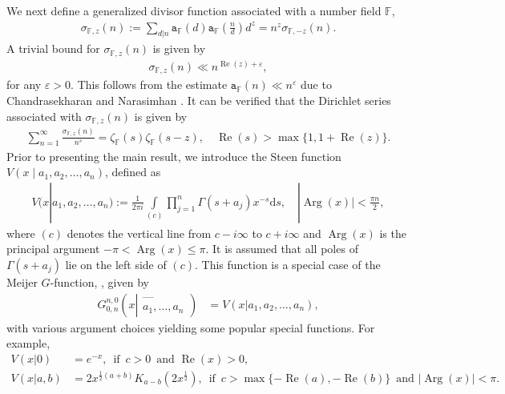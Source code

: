 \documentclass[12pt,reqno]{amsart}
\newcommand{\Arg}{\operatorname{Arg}}
\renewcommand{\Re}{\operatorname{Re}}
\renewcommand{\(}{\left\(}
\renewcommand{\)}{\right\)}
\renewcommand{\[}{\left\[}
\renewcommand{\]}{\right\]}
\numberwithin{equation}{section}
\theoremstyle{plain}
\begin{document}
We next define a generalized divisor function associated with a number field $\mathbb{F}$, 
\begin{align}\label{Gen sigma fn}
\sigma_{\mathbb{F}, z}(n) := \sum_{d|n}\mathtt{a}_{\mathbb{F}}(d)\mathtt{a}_{\mathbb{F}}\left(\frac{n}{d}\right)d^z = n^{z}\sigma_{\mathbb{F}, -z}(n).
\end{align}
A trivial bound for $\sigma_{\mathbb{F},z}(n)$ is given by
\begin{align}\label{sigma bound}
\sigma_{\mathbb{F},z}(n) \ll n^{\Re(z)+\varepsilon},
\end{align}
for any $\varepsilon>0$. This follows from the estimate
$\mathtt{a}_{\mathbb{F}}(n) \ll n^{\varepsilon}$ due to
Chandrasekharan and Narasimhan \cite[Lemma~9]{CN1963}.
It can be verified that the Dirichlet series associated with $\sigma_{\mathbb{F},z}(n)$ is given by
\begin{align}\label{Dirichlet series for generalized divisor function}
\sum_{n=1}^{\infty}\frac{\sigma_{\mathbb{F}, z}(n)}{n^s} = \zeta_{\mathbb{F}}(s)\zeta_{\mathbb{F}}(s-z), \quad \Re(s) > \max\{1, 1+\Re(z)\}.
\end{align}
Prior to presenting the main result, we introduce the Steen function $V(x\mid a_1,a_2,\dots,a_n)$, defined as
\begin{align}\label{Steen fn}
V(x| a_1, a_2, \ldots, a_n) := \frac{1}{2\pi i}\int\limits_{(c)}\prod_{j=1}^{n}\Gamma(s + a_j)x^{-s}\text{d}s, \quad |\Arg(x)| < \frac{\pi n}{2}, 
\end{align}
where $(c)$ denotes the vertical line from $c - i\infty$ to $c + i\infty$ and $\Arg(x)$ is the principal argument $-\pi < \Arg(x) \leq \pi$. It is assumed that all poles of $\Gamma(s+a_j)$ lie on the left side of $(c)$.
This function is a special case of the Meijer $G$-function, \cite[p.~415, Def.~16.17]{OLBC2010}, given by
\begin{align*}
G^{n, 0}_{0, n}\left(x \left| \begin{matrix} \text{---} \\ a_1, \ldots, a_n \end{matrix} \right.\right) &= V(x| a_1, a_2, \ldots, a_n),
\end{align*} 
with various argument choices yielding some popular special functions. For example,
\begin{align} 
V(x| 0) &= e^{-x}, \,\,\, \text{if} \,\,\, c > 0 \,\,\, \text{and} \,\, \Re(x) > 0, \nonumber \\ V(x| a, b) &= 2x^{\frac{1}{2}(a+b)}K_{a-b}(2x^{\frac{1}{2}}), \,\,\, \text{if} \,\,\, c > \max\{-\Re(a), -\Re(b) \} \,\,\, \text{and} \,\, |\Arg(x)| < \pi. \label{Bessel fn formula} 
\end{align}
\end{document}
